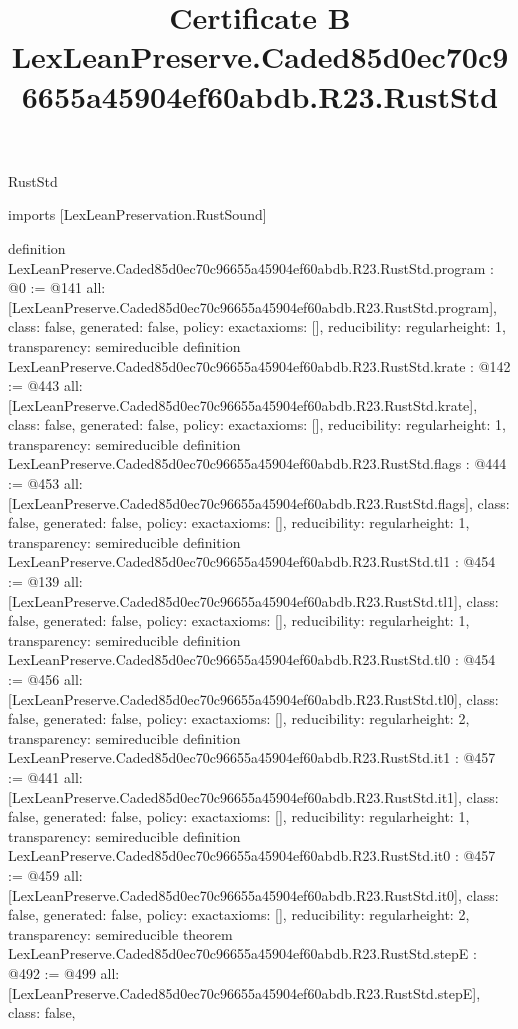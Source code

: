 \begin{lexlean}{RustStd}
\title{Certificate B LexLeanPreserve.Caded85d0ec70c96655a45904ef60abdb.R23.RustStd}
\begin{coremodule}
imports [LexLeanPreservation.RustSound]

definition LexLeanPreserve.Caded85d0ec70c96655a45904ef60abdb.R23.RustStd.program : @0 := @141 {
  all: [LexLeanPreserve.Caded85d0ec70c96655a45904ef60abdb.R23.RustStd.program],
  class: false,
  generated: false,
  policy: exact{axioms: []},
  reducibility: regular{height: 1},
  transparency: semireducible
}
definition LexLeanPreserve.Caded85d0ec70c96655a45904ef60abdb.R23.RustStd.krate : @142 := @443 {
  all: [LexLeanPreserve.Caded85d0ec70c96655a45904ef60abdb.R23.RustStd.krate],
  class: false,
  generated: false,
  policy: exact{axioms: []},
  reducibility: regular{height: 1},
  transparency: semireducible
}
definition LexLeanPreserve.Caded85d0ec70c96655a45904ef60abdb.R23.RustStd.flags : @444 := @453 {
  all: [LexLeanPreserve.Caded85d0ec70c96655a45904ef60abdb.R23.RustStd.flags],
  class: false,
  generated: false,
  policy: exact{axioms: []},
  reducibility: regular{height: 1},
  transparency: semireducible
}
definition LexLeanPreserve.Caded85d0ec70c96655a45904ef60abdb.R23.RustStd.tl1 : @454 := @139 {
  all: [LexLeanPreserve.Caded85d0ec70c96655a45904ef60abdb.R23.RustStd.tl1],
  class: false,
  generated: false,
  policy: exact{axioms: []},
  reducibility: regular{height: 1},
  transparency: semireducible
}
definition LexLeanPreserve.Caded85d0ec70c96655a45904ef60abdb.R23.RustStd.tl0 : @454 := @456 {
  all: [LexLeanPreserve.Caded85d0ec70c96655a45904ef60abdb.R23.RustStd.tl0],
  class: false,
  generated: false,
  policy: exact{axioms: []},
  reducibility: regular{height: 2},
  transparency: semireducible
}
definition LexLeanPreserve.Caded85d0ec70c96655a45904ef60abdb.R23.RustStd.it1 : @457 := @441 {
  all: [LexLeanPreserve.Caded85d0ec70c96655a45904ef60abdb.R23.RustStd.it1],
  class: false,
  generated: false,
  policy: exact{axioms: []},
  reducibility: regular{height: 1},
  transparency: semireducible
}
definition LexLeanPreserve.Caded85d0ec70c96655a45904ef60abdb.R23.RustStd.it0 : @457 := @459 {
  all: [LexLeanPreserve.Caded85d0ec70c96655a45904ef60abdb.R23.RustStd.it0],
  class: false,
  generated: false,
  policy: exact{axioms: []},
  reducibility: regular{height: 2},
  transparency: semireducible
}
theorem LexLeanPreserve.Caded85d0ec70c96655a45904ef60abdb.R23.RustStd.stepE : @492 := @499 {
  all: [LexLeanPreserve.Caded85d0ec70c96655a45904ef60abdb.R23.RustStd.stepE],
  class: false,
}
\end{coremodule}
\end{lexlean}
